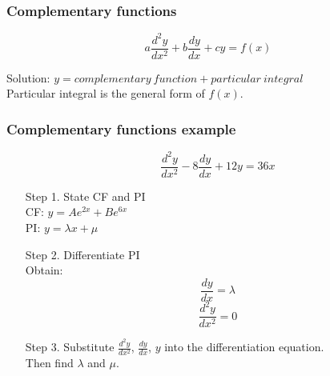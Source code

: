 \documentclass[a4paper,9pt]{scrartcl}
\begin{document}
    \subsubsection{Complementary functions}

    \begin{displaymath}
        a\frac{d^{2}y}{dx^2} + b\frac{dy}{dx} + cy = f(x)
    \end{displaymath}

    Solution: $y = complementary\ function + particular\ integral$ \\

    Particular integral is the general form of $f(x)$. \\

    \subsubsection{Complementary functions example}

    \begin{itemize}
        \item []\begin{displaymath}
                    \frac{d^{2}y}{dx^2} -8\frac{dy}{dx} + 12y = 36x
        \end{displaymath}

        \item [Step 1.] State CF and PI\\
        CF: $y = Ae^{2x}+Be^{6x}$\\
        PI: $y = {\lambda}x + \mu$\\

        \item [Step 2.] Differentiate PI\\
        Obtain: \\
        \begin{displaymath}
            \frac{dy}{dx} = \lambda
        \end{displaymath}
        \begin{displaymath}
            \frac{d^{2}y}{dx^2} = 0
        \end{displaymath}

        \item [Step 3.] Substitute $\frac{d^{2}y}{dx^2}$, $\frac{dy}{dx}$, $y$ into the differentiation equation.\\
        Then find $\lambda$ and $\mu$.
    \end{itemize}
\end{document}
